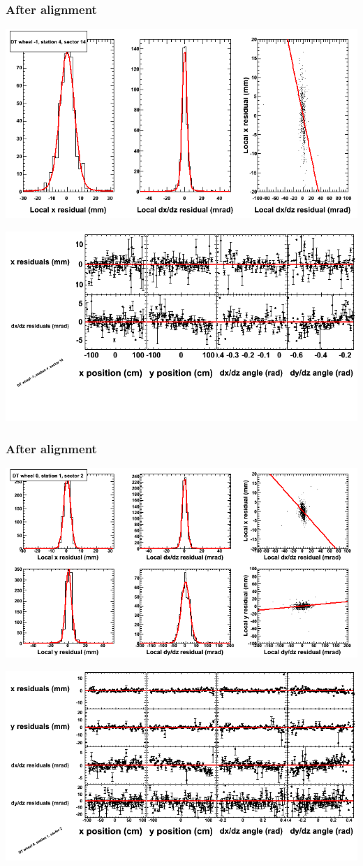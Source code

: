 \documentclass[compress]{beamer}
\begin{document}
\begin{frame}
\frametitle{After alignment}
\includegraphics[width=0.7\linewidth]{NOV4_fitfunctions/MBwhBst4sec14_bellcurves.png}

\includegraphics[width=0.7\linewidth]{NOV4_fitfunctions/MBwhBst4sec14_polynomials.png}
\end{frame}

\begin{frame}
\frametitle{After alignment}
\includegraphics[width=0.7\linewidth]{NOV4_fitfunctions/MBwhCst1sec02_bellcurves.png}

\includegraphics[width=0.7\linewidth]{NOV4_fitfunctions/MBwhCst1sec02_polynomials.png}
\end{frame}
\end{document}
